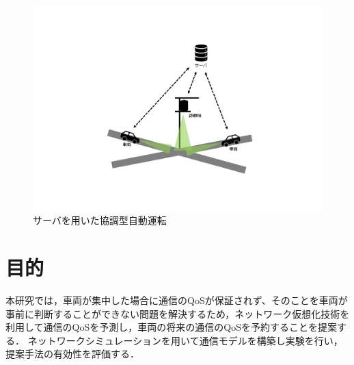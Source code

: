\documentclass[a4paper,11pt,uplatex]{ujreport}
\begin{document}
  \begin{figure}[tb]
    \centering
    \includegraphics[width=\linewidth]{img/サーバを用いた協調型自動運転.pdf}
    \caption{サーバを用いた協調型自動運転}
    \label{fig:CAD}
  \end{figure}

\section{目的}
\label{sec:目的}

    本研究では，車両が集中した場合に通信のQoSが保証されず、そのことを車両が事前に判断することができない問題を解決するため，ネットワーク仮想化技術を利用して通信のQoSを予測し，車両の将来の通信のQoSを予約することを提案する．
    ネットワークシミュレーションを用いて通信モデルを構築し実験を行い，提案手法の有効性を評価する．




\end{document}
